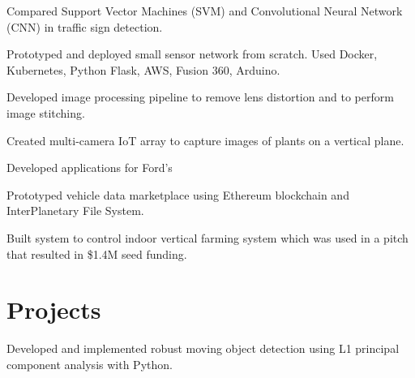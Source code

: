\documentclass[]{deedy-resume-openfont}
\begin{document}
\begin{minipage}[t]{0.70\textwidth}
\begin{tightemize}
\item Compared Support Vector Machines (SVM) and Convolutional Neural Network (CNN) in traffic sign detection.
\item Prototyped and deployed small sensor network from scratch. Used Docker, Kubernetes, Python Flask, AWS, Fusion 360, Arduino.

\end{tightemize}
\sectionsep

\begin{tightemize}
\item Developed image processing pipeline to remove lens distortion and to perform image stitching.
\item Created multi-camera IoT array to capture images of plants  on a vertical plane.
\end{tightemize}
\sectionsep

\begin{tightemize}%

\item Developed applications for Ford's 
 
\item Prototyped vehicle data marketplace using Ethereum blockchain and InterPlanetary File System.

\end{tightemize}
\sectionsep

\begin{tightemize}
\item Built system to control indoor vertical farming system which was used in a pitch that resulted in \$1.4M seed funding.

\end{tightemize}
\sectionsep



\section{Projects}
\begin{tightemize}
\item Developed and implemented robust moving object detection using L1 principal component analysis with Python.
\end{tightemize}
\sectionsep


\end{minipage}
\end{document}
